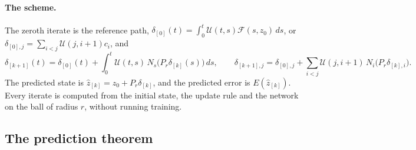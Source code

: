 \documentclass[11pt]{article}
\theoremstyle{definition}
\theoremstyle{remark}
\begin{document}
\paragraph{The scheme.}
The zeroth iterate is the reference path, $\delta_{[0]}(t) = \int_0^t\mathcal{U}(t,s)\mathcal{F}(s,z_0)\,ds$, or $\delta_{[0],j} = \sum_{i<j}\mathcal{U}(j,i+1)c_i$, and
\begin{equation}\label{eq:genpicard}
\delta_{[k+1]}(t) = \delta_{[0]}(t) + \int_0^t\mathcal{U}(t,s)\,N_s\big(P_r\delta_{[k]}(s)\big)\,ds,\qquad
\delta_{[k+1],j} = \delta_{[0],j} + \sum_{i<j}\mathcal{U}(j,i+1)\,N_i\big(P_r\delta_{[k],i}\big).
\end{equation}
The predicted state is $\hat z_{[k]} = z_0 + P_r\delta_{[k]}$, and the predicted error is $E(\hat z_{[k]})$.
Every iterate is computed from the initial state, the update rule and the network on the ball of radius $r$, without running training.

\subsection{The prediction theorem}
\end{document}
